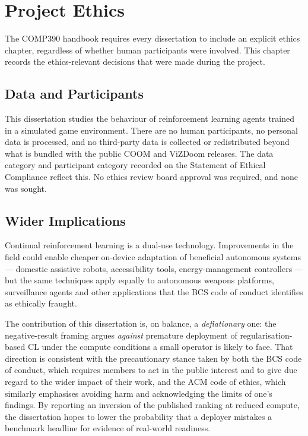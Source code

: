 \chapter{Project Ethics}
\label{ch:ethics}

The COMP390 handbook requires every dissertation to include an
explicit ethics chapter, regardless of whether human participants
were involved. This chapter records the ethics-relevant decisions
that were made during the project.

\section{Data and Participants}

This dissertation studies the behaviour of reinforcement learning
agents trained in a simulated game environment. There are no human
participants, no personal data is processed, and no third-party
data is collected or redistributed beyond what is bundled with the
public COOM and ViZDoom releases. The data category and
participant category recorded on the Statement of Ethical
Compliance reflect this. No ethics review board approval was
required, and none was sought.

\section{Wider Implications}
\label{sec:wider}

Continual reinforcement learning is a dual-use technology.
Improvements in the field could enable cheaper on-device
adaptation of beneficial autonomous systems --- domestic
assistive robots, accessibility tools, energy-management
controllers --- but the same techniques apply equally to
autonomous weapons platforms, surveillance agents and other
applications that the BCS code of conduct identifies as ethically
fraught.

The contribution of this dissertation is, on balance, a
\emph{deflationary} one: the negative-result framing argues
\emph{against} premature deployment of regularisation-based CL
under the compute conditions a small operator is likely to face.
That direction is consistent with the precautionary stance taken
by both the BCS code of conduct, which requires members to act in
the public interest and to give due regard to the wider impact
of their work, and the ACM code of ethics, which similarly
emphasises avoiding harm and acknowledging the limits of one's
findings. By reporting an inversion of the published ranking at
reduced compute, the dissertation hopes to lower the probability
that a deployer mistakes a benchmark headline for evidence of
real-world readiness.

